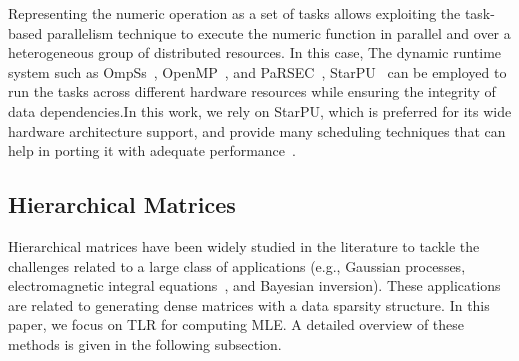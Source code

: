 \documentclass[conference]{IEEEtran}
\begin{document}
Representing the numeric operation as a set of tasks allows exploiting the task-based parallelism technique to execute the numeric function in parallel and over a heterogeneous group of distributed resources. In this case, 
The dynamic runtime system such as  OmpSs~\cite{duran2011ompss}, OpenMP~\cite{chandra2001parallel},  and PaRSEC~\cite{bosilca2012dague},  StarPU~\cite{augonnet2011starpu} can be employed to run the tasks across different hardware resources while ensuring the integrity of data dependencies.In this work, we rely on StarPU, which is preferred for its wide hardware architecture support, and provide many scheduling techniques that can help in porting it with adequate performance~\cite{tzanos2020applying}.

\subsection{Hierarchical Matrices}

Hierarchical matrices have been widely studied in the literature 
to tackle the challenges related to a large class of applications (e.g., Gaussian processes, electromagnetic 
integral equations~\cite{guo2012hierarchical}, and Bayesian inversion). These applications are related to generating dense matrices 
with a data sparsity structure.
In this paper, we focus on TLR for computing MLE. A detailed overview of these
methods is given in the following subsection.
\end{document}
